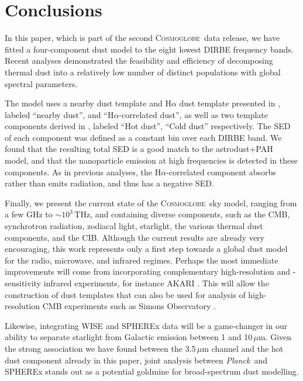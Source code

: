 \documentclass{aa}
\def\Cosmoglobe{\textsc{Cosmoglobe}}
\def\Planck{\textit{Planck}}
\begin{document}
\section{Conclusions}
\label{sec:conclusions}
In this paper, which is part of the second \Cosmoglobe\ data release,
we have fitted a four-component dust model to the eight lowest DIRBE
frequency bands. Recent analyses \citep{CG02_05, CG02_06} demonstrated
the feasibility and efficiency of decomposing thermal dust into a
relatively low number of distinct populations with global spectral
parameters.

The model uses a nearby dust template and H$\alpha$ dust template
presented in \citet{CG02_05}, labeled ``nearby dust'', and
``H$\alpha$-correlated dust'', as well as two template components
derived in \citet{CG02_06}, labeled ``Hot dust'', ``Cold dust''
respectively. The SED of each component was defined as a constant bin
over each DIRBE band. We found that the resulting total SED is a good
match to the astrodust+PAH model, and that the nanoparticle emission
at high frequencies is detected in these components.  As in previous
analyses, the H$\alpha$-correlated component absorbs rather than emits
radiation, and thus has a negative SED.

Finally, we present the current state of the \Cosmoglobe\ sky model,
ranging from a few GHz to $\sim$$10^3$\,THz, and containing diverse
components, such as the CMB, synchrotron radiation, zodiacal light,
starlight, the various thermal dust components, and the CIB. Although
the current results are already very encouraging, this work represents
only a first step towards a global dust model for the radio,
microwave, and infrared regimes. Perhaps the most immediate
improvements will come from incorporating complementary
high-resolution and -sensitivity infrared experiments, for instance
AKARI \citep{murakami:2007}. This will allow the construction of dust
templates that can also be used for analysis of high-resolution CMB
experiments such as Simons Observatory \citep{SO2019}.

Likewise, integrating WISE and SPHEREx data will be a game-changer in
our ability to separate starlight from Galactic emission between 1 and
10\,$\mu$m. Given the strong association we have found between the
3.5\,$\mu$m channel and the hot dust component already in this paper,
joint analysis between \Planck\ and SPHEREx stands out as a
potential goldmine for broad-spectrum dust modelling.
\end{document}
